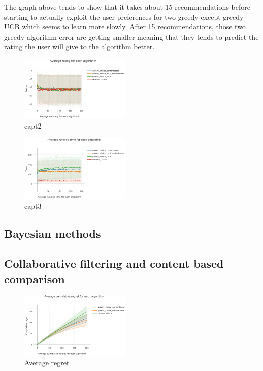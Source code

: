\documentclass[letterpaper]{article}
\begin{document}
The graph above tends to show that it takes about 15 recommendations before starting to actually exploit the user preferences for two greedy except greedy-UCB which seems to learn more slowly. After 15 recommendations, those two greedy algorithm error are getting smaller meaning that they tends to predict the rating the user will give to the algorithm better.


\begin{figure}[H]
\begin{center}
\includegraphics[width=0.47\textwidth]{img/greedy2.png}
\caption{capt2}
\label{schema2}
\end{center}
\end{figure}

\begin{figure}[H]
\begin{center}
\includegraphics[width=0.47\textwidth]{img/greedy3.png}
\caption{capt3}
\label{greedy3}
\end{center}
\end{figure}


\subsection{Bayesian methods}



\subsection{Collaborative filtering and content based comparison}

\begin{figure}[H]
\begin{center}
\includegraphics[width=0.47\textwidth]{img/collabo1.png}
\caption{Average regret}
\label{schema}
\end{center}
\end{figure}
\end{document}
